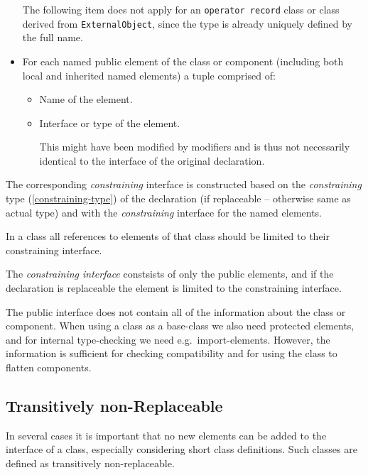 \begin{itemize}
  The following item does not apply for an \lstinline!operator record! class or class derived from \lstinline!ExternalObject!, since the type is already
  uniquely defined by the full name.
\item
  For each named public element of the class or component (including
  both local and inherited named elements) a tuple comprised of:
  \begin{itemize}
  \item
    Name of the element.
  \item
    Interface or type of the element.
    \begin{nonnormative}
    This might have been modified by modifiers and is thus not necessarily identical to the interface of the original declaration.
    \end{nonnormative}
  \end{itemize}
\end{itemize}

The corresponding \emph{constraining} interface is constructed based on
the \emph{constraining} type (\autoref{constraining-type}) of the declaration (if
replaceable -- otherwise same as actual type) and with the
\emph{constraining} interface for the named elements.

In a class all references to elements of that class should be limited to their constraining interface.

\begin{nonnormative}
The \emph{constraining interface} constsists of only the public elements, and if the declaration is replaceable the element is limited to the constraining interface.
\end{nonnormative}

\begin{nonnormative}
The public interface does not contain all of the information about the class or component.  When using a class as a base-class we also need protected elements, and
for internal type-checking we need e.g.\ import-elements.  However, the information is sufficient for checking compatibility and for using the class to flatten components.
\end{nonnormative}

\subsection{Transitively non-Replaceable}

\begin{nonnormative}
In several cases it is important that no new elements can be
added to the interface of a class, especially considering short class
definitions. Such classes are defined as transitively
non-replaceable.
\end{nonnormative}

